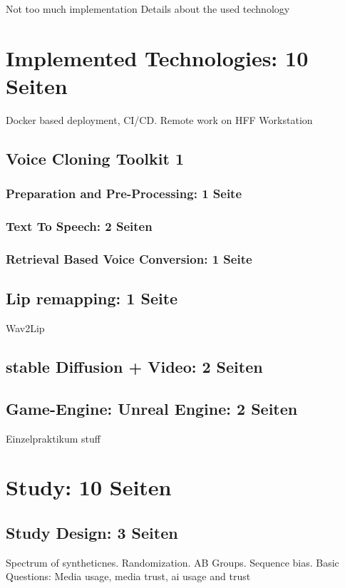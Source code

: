 \documentclass[
  a4paper,  %
  twoside,  %
  bibliography=totoc,
  headsepline,
  cleardoublepage=empty,
  parskip=half,
  draft=false
]{scrbook}
\begin{document}
Not too much implementation Details about the used technology


\chapter{Implemented Technologies: 10 Seiten}
Docker based deployment, CI/CD. Remote work on HFF Workstation

\section{Voice Cloning Toolkit 1}

\subsection{Preparation and Pre-Processing: 1 Seite}
\subsection{Text To Speech: 2 Seiten}
\subsection{Retrieval Based Voice Conversion: 1 Seite}
\section{Lip remapping: 1 Seite}
Wav2Lip
\section{stable Diffusion + Video: 2 Seiten}
\section{Game-Engine: Unreal Engine: 2 Seiten}
Einzelpraktikum stuff

\chapter{Study: 10 Seiten}
\section{Study Design: 3 Seiten}
Spectrum of syntheticnes.
Randomization.
AB Groups. 
Sequence bias.
Basic Questions: Media usage, media trust, ai usage and trust
\end{document}
